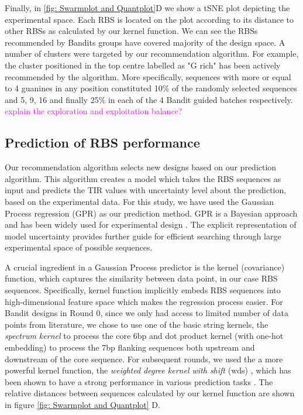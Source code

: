 \documentclass{article}
\newcommand{\mengyan}[1]{\textcolor{magenta}{#1}}
\begin{document}
Finally, in \ref{fig: Swarmplot and Quantplot}D we show a tSNE plot depicting the experimental space.
Each RBS is located on the plot according to its distance to other RBSs as calculated by our kernel function.
We can see the RBSs recommended by Bandits groups have covered majority of the design space. 
A number of clusters were targeted by our recommendation algorithm.
For example, the cluster positioned in the top centre labelled as "G rich" has been actively recommended by the algorithm.
More specifically, sequences with more or equal to 4 guanines in any position constituted 10\% of the randomly selected sequences and 5, 9, 16 and finally 25\% in each of the 4 Bandit guided batches respectively.
\mengyan{explain the exploration and exploitation balance?}

\subsection{Prediction of RBS performance}

Our recommendation algorithm selects new designs based on our prediction algorithm.
This algorithm creates a model which takes the RBS sequences as input and predicts the TIR values with uncertainty level about the prediction, based on the experimental data.
For this study, we have used the Gaussian Process regression (GPR) as our prediction method.
GPR is a Bayesian approach and has been widely used for experimental design \cite{srinivas2012information, romero_navigating_2013}.
The explicit representation of model uncertainty provides further guide for efficient searching through large experimental space of possible sequences.

A crucial ingredient in a Gaussian Process predictor \cite{Rasmussen2004} is the kernel (covariance) function, which captures the similarity between data point, in our case RBS sequences.
Specifically, kernel function implicitly embeds RBS sequences into high-dimensional feature space which makes the regression process easier.
For Bandit designs in Round 0, since we only had access to limited number of data points from literature, we chose to use one of the basic string kernels, the \textit{spectrum kernel} \cite{leslie2001spectrum} to process the core 6bp and dot product kernel \cite{Rasmussen2004} (with one-hot embedding) to process the 7bp flanking sequences both upstream and downstream of the core sequence.
For subsequent rounds, we used the a more powerful kernel function, the \textit{weighted degree kernel with shift} (wds) \cite{ratsch_rase_2005_wds}, which has been shown to have a strong performance in various prediction tasks \cite{Ben-Hur2008}.
The relative distances between sequences calculated by our kernel function are shown in figure \ref{fig: Swarmplot and Quantplot} D.
\end{document}
